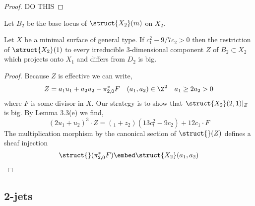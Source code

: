 \documentclass[12pt]{article}
\begin{document}
\begin{proof}
{\color{red} DO THIS}
\end{proof}

Let $B_2$ be the base locus of $\struct{X_2}(m)$ on $X_2$.

\begin{prop}
Let $X$ be a minimal surface of general type. If $c_1^2 - 9/7 c_2 > 0$ then the restriction of $\struct{X_2}(1)$ to every irreducible $3$-dimensional component $Z$ of $B_2 \subset X_2$ which projects onto $X_1$ and differs from $D_2$ is big.
\end{prop}

\begin{proof}
Because $Z$ is effective we can write,
\[ Z = a_1 u_1 + a_2 u_2 - \pi_{2,0}^* F \quad (a_1, a_2) \in \Z^2 \quad a_1 \ge 2 a_2 > 0 \]
where $F$ is some divisor in $X$. Our strategy is to show that $\struct{X_2}(2,1)|_Z$ is big. By Lemma 3.3(e) we find,
\[ (2 u_1 + u_2)^3 \cdot Z = (_1 + z_2) (13 c_!^2 - 9 c_2) + 12 c_1 \cdot F \]
The multiplication morphism by the canonical section of $\struct{}(Z)$ defines a sheaf injection
\[ \struct{}(\pi_{2,0}^* F) \embed \struct{X_2}(a_1, a_2) \]
\end{proof}

\subsection{2-jets}
\end{document}
